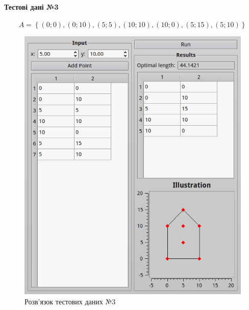 \documentclass[a4paper,12pt,notitlepage,pdftex]{scrartcl}
\begin{document}
\paragraph{Тестові дані №3}
\begin{equation}
  A = \left\{ \left( 0; 0 \right), \left( 0; 10 \right), \left( 5; 5
  \right), \left( 10; 10 \right), \left( 10; 0 \right), \left( 5; 15
\right), \left( 5; 10 \right) \right\}
  \label{eq:t3}
\end{equation}
\begin{figure}[h!]
  \centering
  \includegraphics[scale=0.65]{scr3.png}
  \caption{Розв’язок тестових даних №3}
  \label{fig:f3}
\end{figure}
\end{document}
